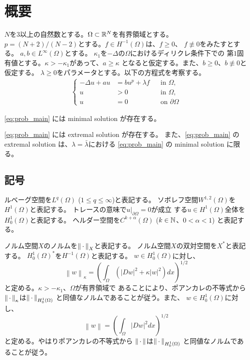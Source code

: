 \section{概要}

$N$を$3$以上の自然数とする。$\Omega \subset \mathbb{R}^N$を有界領域とする。
$p = (N+2)/(N-2)$とする。$f \in H^{-1}(\Omega)$は、$f \geq 0$、
$f \not \equiv 0$をみたすとする。
$a, b \in L^\infty(\Omega)$とする。
$\kappa_1$を$-\Delta$の$\Omega$におけるディリクレ条件下での
第$1$固有値とする。$\kappa > - \kappa_1$があって、$a \geq \kappa$
となると仮定する。また、$b \geq 0$、$b \not \equiv 0$と仮定する。
$\lambda \geq 0$をパラメータとする。以下の方程式を考察する。
\begin{align}
 \left\{
 \begin{aligned}
  -\Delta u + a u &= b u^p + \lambda f  & &\text{in~} \Omega,  \\
  u &> 0 & &\text{in~} \Omega, \\
  u &= 0 & &\text{on~} \partial\Omega
 \end{aligned}
 \right. \tag*{$(\star)_\lambda$} \label{eq:prob_main}
\end{align}

\begin{thm} \label{thm:minimal_solution}
 \ref{eq:prob_main} には minimal solution が存在する。
\end{thm}

\begin{thm} \label{thm:extremal_solution}
 \ref{eq:prob_main} には extremal solution が存在する。
 また、\ref{eq:prob_main} の 
 extremal solution は、$\lambda = \bar{\lambda}$における
 \ref{eq:prob_main} の
 minimal solution に限る。
\end{thm}

\subsection{記号}

ルベーグ空間を$L^q(\Omega)$ ($1 \leq q \leq \infty$)と表記する。
ソボレフ空間$W^{1, 2}(\Omega)$を$H^1(\Omega)$と表記する。
トレースの意味で$u |_{\partial \Omega} = 0$が成立
する$u \in H^1(\Omega)$全体を$H_0^1(\Omega)$と表記する。
ヘルダー空間を$C^{k + \alpha}(\Omega)$ ($k \in \mathbb{N}$、$0 < \alpha < 1$)
と表記する。

ノルム空間$X$のノルムを$\left\|\, \cdot \, \right\|_X$と表記する。
ノルム空間$X$の双対空間を$X^*$と表記する。
$H_0^1(\Omega)^*$を$H^{-1}(\Omega)$と表記する。
$w \in H_0^1(\Omega)$に対し、
\[
 \left\| w \right\|_\kappa = \left(\int_\Omega \left( \lvert Dw \rvert^2 +
 \kappa \lvert w \rvert^2 \right) dx\right)^{1/2}
\]
と定める。$\kappa > -\kappa_1$、$\Omega$が有界領域で
あることにより、ポアンカレの不等式から
$\left\|\, \cdot \, \right\|_\kappa$は$\left\|\, \cdot \, \right\|_{H_0^1(\Omega)}$
と同値なノルムであることが従う。また、
$w \in H_0^1(\Omega)$に対し、
\[
 \left\| w \right\| = \left(\int_\Omega \lvert Dw \rvert^2 dx\right)^{1/2}
\]
と定める。やはりポアンカレの不等式から
$\left\|\, \cdot \, \right\|$は$\left\|\, \cdot \, \right\|_{H_0^1(\Omega)}$
と同値なノルムであることが従う。